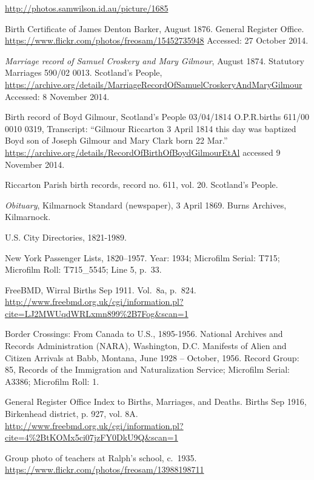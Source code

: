 \begin{thebibliography}{99}
	\url{http://photos.samwilson.id.au/picture/1685}

	Birth Certificate of James Denton Barker, August 1876. General Register Office.
	\url{https://www.flickr.com/photos/freosam/15452735948}
	Accessed: 27 October 2014.

	\emph{Marriage record of Samuel Croskery and Mary Gilmour}, August 1874.
	Statutory Marriages 590/02 0013. Scotland's People,
	\url{https://archive.org/details/MarriageRecordOfSamuelCroskeryAndMaryGilmour}
	Accessed: 8 November 2014.

	Birth record of Boyd Gilmour,
	Scotland's People 03/04/1814 O.P.R.births 611/00 0010 0319,
	Transcript: ``Gilmour Riccarton 3 April 1814 this day was baptized Boyd son of Joseph Gilmour and Mary Clark born 22 Mar.''
	\url{https://archive.org/details/RecordOfBirthOfBoydGilmourEtAl} accessed 9 November 2014.

	Riccarton Parish birth records, record no. 611, vol. 20. Scotland's People.

	\emph{Obituary}, Kilmarnock Standard (newspaper), 3 April 1869. Burns Archives, Kilmarnock.

	U.S. City Directories, 1821-1989.

	New York Passenger Lists, 1820--1957. Year: 1934; Microfilm Serial: T715; Microfilm Roll: T715\_5545; Line 5, p.\ 33.

	FreeBMD, Wirral Births Sep 1911. Vol.\ 8a, p.\ 824.
	\url{http://www.freebmd.org.uk/cgi/information.pl?cite=LJ2MWUqdWRLxmn899\%2B7Fog&scan=1}


	Border Crossings: From Canada to U.S., 1895-1956.
	National Archives and Records Administration (NARA), Washington, D.C.
	Manifests of Alien and Citizen Arrivals at Babb, Montana, June 1928 -- October, 1956.
	Record Group: 85, Records of the Immigration and Naturalization Service; Microfilm Serial: A3386; Microfilm Roll: 1.

	General Register Office Index to Births, Marriages, and Deaths.
	Births Sep 1916, Birkenhead district, p. 927, vol. 8A.
	\url{http://www.freebmd.org.uk/cgi/information.pl?cite=4\%2BtKOMx5ci07jzFY0DkU9Q&scan=1}

	Group photo of teachers at Ralph's school, c.\ 1935.
	\url{https://www.flickr.com/photos/freosam/13988198711}


\end{thebibliography}

